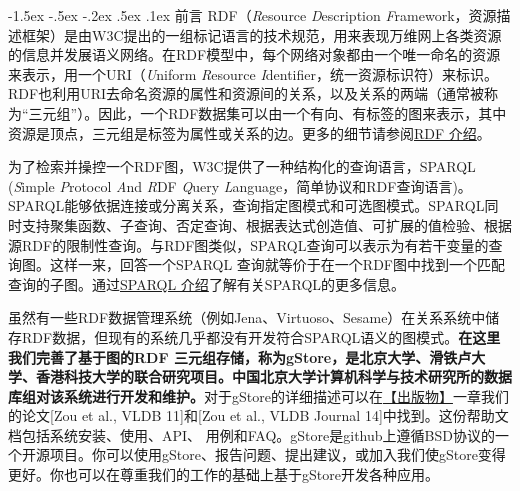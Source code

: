 \documentclass[titlepage, a4paper, 12pt]{article}
\makeatletter
\newcommand{\sihao}{\fontsize{14pt}{\baselineskip}\selectfont}
\renewcommand\section{\@startsection{section}{1}{\z@}%
{-1.5ex \@plus -.5ex \@minus -.2ex}%
{.5ex \@plus .1ex}%
{\normalfont\sihao\CJKfamily{hei}}}
\makeatother
\begin{document}
\setcounter{tocdepth}{4}
\renewcommand{\contentsname}{目\hspace{2em}录} %
\begin{center}  %
\tableofcontents
\end{center}
\clearpage


\section{前言}
RDF（\emph{R}esource \emph{D}escription \emph{F}ramework，资源描述框架）是由W3C提出的一组标记语言的技术规范，用来表现万维网上各类资源的信息并发展语义网络。在RDF模型中，每个网络对象都由一个唯一命名的资源来表示，用一个URI（\emph{U}niform \emph{R}esource \emph{I}dentifier，统一资源标识符）来标识。RDF也利用URI去命名资源的属性和资源间的关系，以及关系的两端（通常被称为“三元组”）。因此，一个RDF数据集可以由一个有向、有标签的图来表示，其中资源是顶点，三元组是标签为属性或关系的边。更多的细节请参阅\href{https://www.w3.org/RDF/}{RDF 介绍}。

为了检索并操控一个RDF图，W3C提供了一种结构化的查询语言，SPARQL (\emph{S}imple \emph{P}rotocol \emph{A}nd \emph{R}DF \emph{Q}uery \emph{L}anguage，简单协议和RDF查询语言)。SPARQL能够依据连接或分离关系，查询指定图模式和可选图模式。SPARQL同时支持聚集函数、子查询、否定查询、根据表达式创造值、可扩展的值检验、根据源RDF的限制性查询。与RDF图类似，SPARQL查询可以表示为有若干变量的查询图。这样一来，回答一个SPARQL 查询就等价于在一个RDF图中找到一个匹配查询的子图。通过\href{https://www.w3.org/TR/sparql11-query/}{SPARQL 介绍}了解有关SPARQL的更多信息。

虽然有一些RDF数据管理系统（例如Jena、Virtuoso、Sesame）在关系系统中储存RDF数据，但现有的系统几乎都没有开发符合SPARQL语义的图模式。\textbf{在这里我们完善了基于图的RDF 三元组存储，称为gStore，是北京大学、滑铁卢大学、香港科技大学的联合研究项目。中国北京大学计算机科学与技术研究所的数据库组对该系统进行开发和维护。}对于gStore的详细描述可以在\hyperref[chapter09]{【出版物】}一章我们的论文{[}Zou et al., VLDB 11{]}和{[}Zou et al., VLDB Journal 14{]}中找到。这份帮助文档包括系统安装、使用、API、 用例和FAQ。gStore是github上遵循BSD协议的一个开源项目。你可以使用gStore、报告问题、提出建议，或加入我们使gStore变得更好。你也可以在尊重我们的工作的基础上基于gStore开发各种应用。
\end{document}
